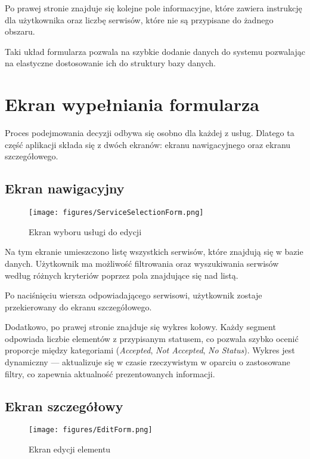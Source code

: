  Po  prawej stronie znajduje się kolejne pole informacyjne, które zawiera instrukcję dla użytkownika oraz liczbę serwisów, które nie są przypisane do żadnego obszaru.
\vspace{0.5cm}

Taki układ formularza pozwala na szybkie dodanie danych do systemu pozwalając na elastyczne dostosowanie ich do struktury bazy danych.

\section{Ekran wypełniania formularza}
Proces podejmowania decyzji odbywa się osobno dla każdej z usług. Dlatego ta część aplikacji składa się z dwóch ekranów: ekranu nawigacyjnego oraz ekranu szczegółowego.

\subsection{Ekran nawigacyjny}
 \begin{figure}[h]
 \centering
 \texttt{[image: figures/ServiceSelectionForm.png]}
 \caption{Ekran wyboru usługi do edycji}
 \label{fig:ServiceSelectionForm }
 \end{figure}

 Na tym ekranie umieszczono listę wszystkich serwisów, które znajdują się w bazie danych. Użytkownik ma możliwość filtrowania oraz wyszukiwania serwisów według różnych kryteriów poprzez pola znajdujące się nad listą.

 Po naciśnięciu wiersza odpowiadającego serwisowi, użytkownik zostaje przekierowany do ekranu szczegółowego.

 Dodatkowo, po prawej stronie znajduje się wykres kołowy. Każdy segment odpowiada liczbie elementów z przypisanym statusem, co pozwala szybko ocenić proporcje między kategoriami (\emph{Accepted}, \emph{Not Accepted}, \emph{No Status}). Wykres jest dynamiczny — aktualizuje się w czasie rzeczywistym w oparciu o zastosowane filtry, co zapewnia aktualność prezentowanych informacji.

 \subsection{Ekran szczegółowy}


 \begin{figure}[h]
 \centering
 \texttt{[image: figures/EditForm.png]}
 \caption{Ekran edycji elementu}
 \label{fig:EditForm}
 \end{figure}

